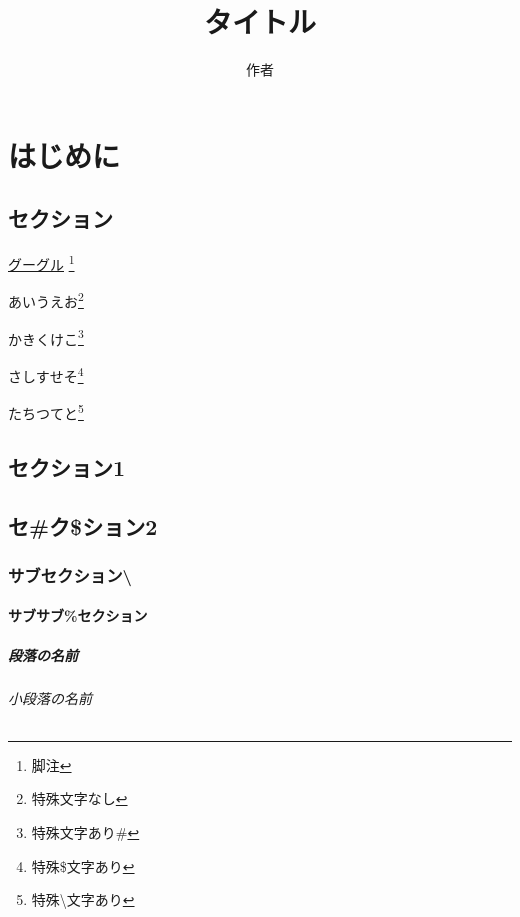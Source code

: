 \documentclass[uplatex, oneside]{jsbook}
\title{タイトル}
\author{作者}
\begin{document}
\maketitle
\tableofcontents

\chapter{はじめに}

\section{セクション}

\href{http://www.google.co.jp}{グーグル}
\footnote{脚注}

\newpage

あいうえお\footnote{特殊文字なし}

かきくけこ\footnote{特殊文字あり\#}

さしすせそ\footnote{特殊\$文字あり}

たちつてと\footnote{特殊\textbackslash 文字あり}

\newpage

\section{セクション1}

\section{セ\#ク\$ション2}

\subsection{サブセクション\textbackslash}

\subsubsection{サブサブ\%セクション}

\paragraph{段落の名前}

\subparagraph{小段落の名前}
\end{document}
